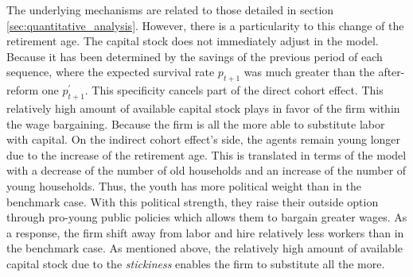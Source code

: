 The underlying mechanisms are related to those detailed in section \ref{sec:quantitative_analysis}. However, there is a particularity to this change of the retirement age. The capital stock does not immediately adjust in the model. Because it has been determined by the savings of the previous period of each sequence, where the expected survival rate $p_{t+1}$ was much greater than the after-reform one $p^\prime_{t+1}$. This specificity cancels part of the direct cohort effect. This relatively high amount of available capital stock plays in favor of the firm within the wage bargaining. Because the firm is all the more able to substitute labor with capital. On the indirect cohort effect's side, the agents remain young longer due to the increase of the retirement age. This is translated in terms of the model with a decrease of the number of old households and an increase of the number of young households. Thus, the youth has more political weight than in the benchmark case. With this political strength, they raise their outside option through pro-young public policies which allows them to bargain greater wages. As a response, the firm shift away from labor and hire relatively less workers than in the benchmark case. As mentioned above, the relatively high amount of available capital stock due to the \textit{stickiness} enables the firm to substitute all the more.

